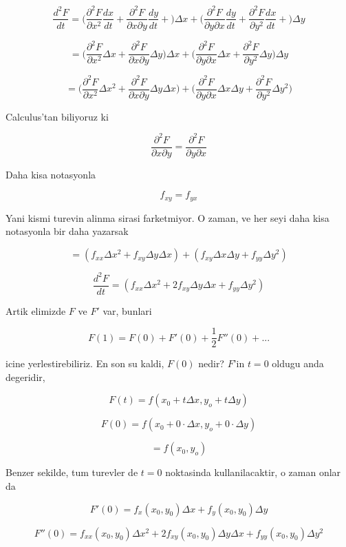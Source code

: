 \documentclass[12pt,fleqn]{article}\usepackage{../common}
\begin{document}
$$ \frac{d^2F}{dt} =
\bigg(
\frac{\partial ^2 F}{\partial x^2}\frac{dx}{dt} + 
\frac{\partial ^2 F}{\partial x \partial y}\frac{dy}{dt} + 
\bigg) \Delta x +
\bigg(
\frac{\partial ^2 F}{\partial y \partial x}\frac{dy}{dt} + 
\frac{\partial ^2 F}{\partial y^2}\frac{dx}{dt} + 
\bigg) \Delta y 
$$

$$ =
\bigg(
\frac{\partial ^2 F}{\partial x^2}\Delta x + 
\frac{\partial ^2 F}{\partial x \partial y}\Delta y 
\bigg) \Delta x +
\bigg(
\frac{\partial ^2 F}{\partial y \partial x}\Delta x + 
\frac{\partial ^2 F}{\partial y^2}\Delta y 
\bigg) \Delta y 
 $$

$$ =
\bigg(
\frac{\partial ^2 F}{\partial x^2}\Delta x^2 + 
\frac{\partial ^2 F}{\partial x \partial y}\Delta y \Delta x
\bigg) +
\bigg(
\frac{\partial ^2 F}{\partial y \partial x}\Delta x \Delta y + 
\frac{\partial ^2 F}{\partial y^2}\Delta y^2
\bigg) 
 $$

Calculus'tan biliyoruz ki 

$$ 
\frac{\partial ^2 F}{\partial x \partial y} = 
\frac{\partial ^2 F}{\partial y \partial x} 
 $$

Daha kisa notasyonla

$$ f_{xy} = f_{yx} $$

Yani kismi turevin alinma sirasi farketmiyor. O zaman, ve her seyi daha
kisa notasyonla bir daha yazarsak

$$ =
(f_{xx}\Delta x^2 + f_{xy}\Delta y \Delta x ) +
(f_{xy}\Delta x \Delta y + f_{yy}\Delta y^2 )
 $$

$$
\frac{d^2F}{dt}  =
(f_{xx}\Delta x^2 + 2f_{xy}\Delta y \Delta x + f_{yy}\Delta y^2 )
 $$

Artik elimizde $F$ ve $F'$ var, bunlari 

$$ F(1) = F(0) + F'(0) + \frac{1}{2}F''(0) + ... $$

icine yerlestirebiliriz. En son su kaldi, $F(0)$ nedir? $F$'in $t=0$ oldugu
anda degeridir, 

$$ F(t) = f(x_0 + t\Delta x, y_o + t\Delta y) $$

$$ F(0) = f(x_0 + 0 \cdot \Delta x, y_o + 0 \cdot \Delta y) $$

$$ = f(x_0 , y_o) $$

Benzer sekilde, tum turevler de $t=0$ noktasinda kullanilacaktir, o zaman
onlar da

$$ F'(0) = f_x(x_0,y_0) \Delta x + f_y(x_0,y_0) \Delta y $$

$$ F''(0) =  
f_{xx}(x_0,y_0)\Delta x^2 + 2f_{xy}(x_0,y_0)\Delta y \Delta x + 
f_{yy}(x_0,y_0)\Delta y^2 
$$
\end{document}
